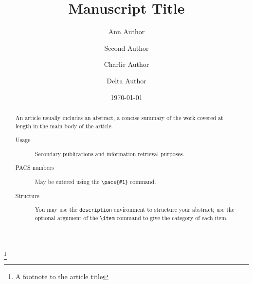 \documentclass[%
 reprint,
 amsmath,amssymb,
prb,
]{revtex4-1}
\begin{document}

\title{Manuscript Title}%
\thanks{A footnote to the article title}%

\author{Ann Author}
\author{Second Author}%
%


\author{Charlie Author}
%
%
\author{Delta Author}
%


\date{\today}%

\begin{abstract}
An article usually includes an abstract, a concise summary of the work
covered at length in the main body of the article. 
\begin{description}
\item[Usage]
Secondary publications and information retrieval purposes.
\item[PACS numbers]
May be entered using the \verb+\pacs{#1}+ command.
\item[Structure]
You may use the \texttt{description} environment to structure your abstract;
use the optional argument of the \verb+\item+ command to give the category of each item. 
\end{description}
\end{abstract}

\maketitle
\end{document}
